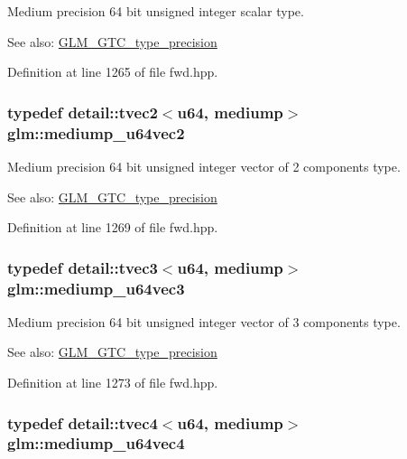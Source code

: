 Medium precision 64 bit unsigned integer scalar type. \begin{Desc}
\item[See also:]\hyperlink{group__gtc__type__precision}{GLM\_\-GTC\_\-type\_\-precision} \end{Desc}


Definition at line 1265 of file fwd.hpp.\hypertarget{group__gtc__type__precision_g9eda8d6f5be7a2919fb90412535b385f}{
\subsubsection[mediump\_\-u64vec2]{\setlength{\rightskip}{0pt plus 5cm}typedef detail::tvec2$<$u64, mediump$>$ {\bf glm::mediump\_\-u64vec2}}}
\label{group__gtc__type__precision_g9eda8d6f5be7a2919fb90412535b385f}


Medium precision 64 bit unsigned integer vector of 2 components type. \begin{Desc}
\item[See also:]\hyperlink{group__gtc__type__precision}{GLM\_\-GTC\_\-type\_\-precision} \end{Desc}


Definition at line 1269 of file fwd.hpp.\hypertarget{group__gtc__type__precision_g7af0601e6a8ce71bd21ecf67971f5154}{
\subsubsection[mediump\_\-u64vec3]{\setlength{\rightskip}{0pt plus 5cm}typedef detail::tvec3$<$u64, mediump$>$ {\bf glm::mediump\_\-u64vec3}}}
\label{group__gtc__type__precision_g7af0601e6a8ce71bd21ecf67971f5154}


Medium precision 64 bit unsigned integer vector of 3 components type. \begin{Desc}
\item[See also:]\hyperlink{group__gtc__type__precision}{GLM\_\-GTC\_\-type\_\-precision} \end{Desc}


Definition at line 1273 of file fwd.hpp.\hypertarget{group__gtc__type__precision_ge25a6609fa377ba1ec983ec32a91f1d4}{
\subsubsection[mediump\_\-u64vec4]{\setlength{\rightskip}{0pt plus 5cm}typedef detail::tvec4$<$u64, mediump$>$ {\bf glm::mediump\_\-u64vec4}}}
\label{group__gtc__type__precision_ge25a6609fa377ba1ec983ec32a91f1d4}


